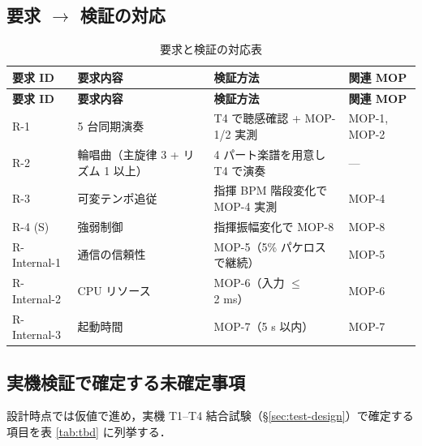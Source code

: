 \documentclass[lualatex,book,paper=a4paper,jafontsize=11.5pt,jafontscale=1.05]{jlreq}
\begin{document}
\subsection{要求 $\to$ 検証の対応}

\begin{longtable}{l p{} p{} l}
\caption{要求と検証の対応表}\label{tab:req-verify}\\
\toprule
\textbf{要求 ID} & \textbf{要求内容} & \textbf{検証方法} & \textbf{関連 MOP} \\
\midrule
\endfirsthead
\toprule
\textbf{要求 ID} & \textbf{要求内容} & \textbf{検証方法} & \textbf{関連 MOP} \\
\midrule
\endhead
R-1 & 5 台同期演奏           & T4 で聴感確認 + MOP-1/2 実測   & MOP-1, MOP-2 \\
R-2 & 輪唱曲（主旋律 3 + リズム 1 以上） & 4 パート楽譜を用意し T4 で演奏 & — \\
R-3 & 可変テンポ追従          & 指揮 BPM 階段変化で MOP-4 実測 & MOP-4 \\
R-4 (S) & 強弱制御            & 指揮振幅変化で MOP-8           & MOP-8 \\
R-Internal-1 & 通信の信頼性    & MOP-5（5\% パケロスで継続）    & MOP-5 \\
R-Internal-2 & CPU リソース    & MOP-6（入力 $\leq$ 2 ms）      & MOP-6 \\
R-Internal-3 & 起動時間        & MOP-7（5 s 以内）              & MOP-7 \\
\bottomrule
\end{longtable}

\subsection{実機検証で確定する未確定事項}\label{subsec:tbd}

設計時点では仮値で進め，実機 T1--T4 結合試験（\S\ref{sec:test-design}）で確定する項目を表 \ref{tab:tbd} に列挙する．
\end{document}
